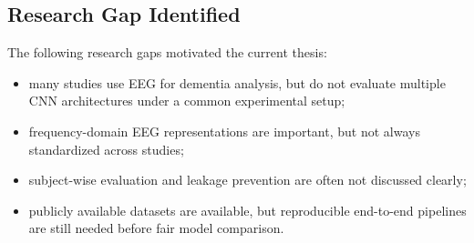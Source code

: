 \documentclass[12pt,a4paper]{article}
\begin{document}
\subsection{Research Gap Identified}
The following research gaps motivated the current thesis:
\begin{itemize}
    \item many studies use EEG for dementia analysis, but do not evaluate multiple CNN architectures under a common experimental setup;
    \item frequency-domain EEG representations are important, but not always standardized across studies;
    \item subject-wise evaluation and leakage prevention are often not discussed clearly;
    \item publicly available datasets are available, but reproducible end-to-end pipelines are still needed before fair model comparison.
\end{itemize}
\end{document}
